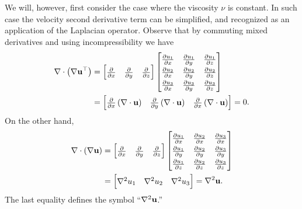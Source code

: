 We will, however, first consider the case where the viscosity $\nu$ is constant.  In such case the velocity second derivative term can be simplified, and recognized as an application of the Laplacian operator.  Observe that by commuting mixed derivatives and using incompressibility we have
\begin{align*}
\Div \left(\grad \bu^{\top}\right) &= \renewcommand{\arraystretch}{1.3}\begin{bmatrix}
    \frac{\partial}{\partial x} & \frac{\partial}{\partial y} & \frac{\partial}{\partial z}
    \end{bmatrix}
    \begin{bmatrix}
    \frac{\partial u_1}{\partial x} & \frac{\partial u_1}{\partial y} & \frac{\partial u_1}{\partial z} \\
    \frac{\partial u_2}{\partial x} & \frac{\partial u_2}{\partial y} & \frac{\partial u_2}{\partial z} \\
    \frac{\partial u_3}{\partial x} & \frac{\partial u_3}{\partial y} & \frac{\partial u_3}{\partial z}
    \end{bmatrix} \\
  &= \begin{bmatrix}
    \frac{\partial}{\partial x}\left(\Div \bu\right) & \frac{\partial}{\partial y }\left(\Div \bu\right) & \frac{\partial}{\partial x} \left(\Div \bu\right)
    \end{bmatrix}
    = 0.
\end{align*}
On the other hand,
\begin{align*}
\Div \left(\grad \bu\right) &= \renewcommand{\arraystretch}{1.3}\begin{bmatrix}
    \frac{\partial}{\partial x} & \frac{\partial}{\partial y} & \frac{\partial}{\partial z}
    \end{bmatrix}
    \begin{bmatrix}
    \frac{\partial u_1}{\partial x} & \frac{\partial u_2}{\partial x} & \frac{\partial u_3}{\partial x} \\
    \frac{\partial u_1}{\partial y} & \frac{\partial u_2}{\partial y} & \frac{\partial u_3}{\partial y} \\
    \frac{\partial u_1}{\partial z} & \frac{\partial u_2}{\partial z} & \frac{\partial u_3}{\partial z}
    \end{bmatrix} \\
  &= \begin{bmatrix} \grad^2 u_1 & \grad^2 u_2 & \grad^2 u_3 \end{bmatrix} = \grad^2 \bu.
\end{align*}
The last equality defines the symbol ``$\nabla^2 \mathbf{u}$.''

